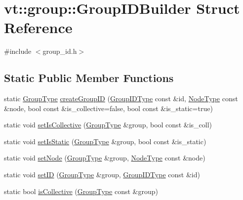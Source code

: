 \hypertarget{structvt_1_1group_1_1_group_i_d_builder}{}\section{vt\+:\+:group\+:\+:Group\+I\+D\+Builder Struct Reference}
\label{structvt_1_1group_1_1_group_i_d_builder}


{\ttfamily \#include $<$group\+\_\+id.\+h$>$}

\subsection*{Static Public Member Functions}
\begin{DoxyCompactItemize}
\item 
static \hyperlink{namespacevt_a27b5e4411c9b6140c49100e050e2f743}{Group\+Type} \hyperlink{structvt_1_1group_1_1_group_i_d_builder_aea5ed64876ed495000fe0bf7e86549cf}{create\+Group\+ID} (\hyperlink{namespacevt_1_1group_a805a6643787ae841525c371fd0cefeb3}{Group\+I\+D\+Type} const \&id, \hyperlink{namespacevt_a866da9d0efc19c0a1ce79e9e492f47e2}{Node\+Type} const \&node, bool const \&is\+\_\+collective=false, bool const \&is\+\_\+static=true)
\item 
static void \hyperlink{structvt_1_1group_1_1_group_i_d_builder_a5f3eced580ac5effe2511d12aaa149b5}{set\+Is\+Collective} (\hyperlink{namespacevt_a27b5e4411c9b6140c49100e050e2f743}{Group\+Type} \&group, bool const \&is\+\_\+coll)
\item 
static void \hyperlink{structvt_1_1group_1_1_group_i_d_builder_afb020ef55e73ee7f3ceb356249035a16}{set\+Is\+Static} (\hyperlink{namespacevt_a27b5e4411c9b6140c49100e050e2f743}{Group\+Type} \&group, bool const \&is\+\_\+static)
\item 
static void \hyperlink{structvt_1_1group_1_1_group_i_d_builder_a612af6198c4c82251702d4bda4f50f32}{set\+Node} (\hyperlink{namespacevt_a27b5e4411c9b6140c49100e050e2f743}{Group\+Type} \&group, \hyperlink{namespacevt_a866da9d0efc19c0a1ce79e9e492f47e2}{Node\+Type} const \&node)
\item 
static void \hyperlink{structvt_1_1group_1_1_group_i_d_builder_a1e4a17d298d60987acdeabecf71ce339}{set\+ID} (\hyperlink{namespacevt_a27b5e4411c9b6140c49100e050e2f743}{Group\+Type} \&group, \hyperlink{namespacevt_1_1group_a805a6643787ae841525c371fd0cefeb3}{Group\+I\+D\+Type} const \&id)
\item 
static bool \hyperlink{structvt_1_1group_1_1_group_i_d_builder_a5b2f2ee5ba75baeadec6ef06ad7d9234}{is\+Collective} (\hyperlink{namespacevt_a27b5e4411c9b6140c49100e050e2f743}{Group\+Type} const \&group)

\end{DoxyCompactItemize}
